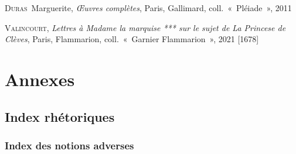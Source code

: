 \documentclass[12pt, a4paper]{article}
\begin{document}
    \textsc{Duras}~Marguerite, \textit{Œuvres complètes}, Paris, Gallimard, coll.~«~Pléiade~», 2011\par 
    \textsc{Valincourt}, \textit{Lettres à Madame la marquise *** sur le sujet de La Princese de Clèves}, Paris, Flammarion, coll.~«~Garnier Flammarion~», 2021 [1678]\par 
        
          
\newpage

\section{Annexes}

\subsection{Index rhétoriques}
\label{gloss}
\subsubsection{Index des notions adverses}
\end{document}
